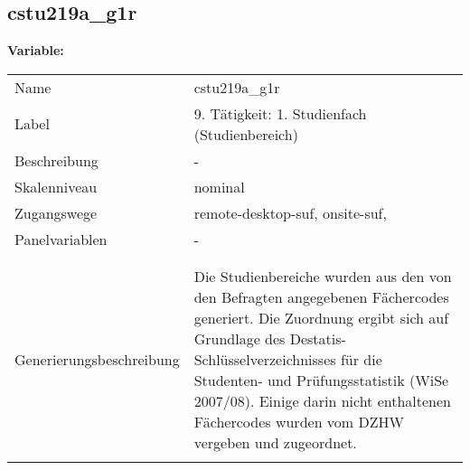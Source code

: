 	
	
	\subsection{cstu219a\_g1r}
	\label{subSection:cstu219a_g1r}

	\noindent\textbf{Variable:}\\
		\begin{tabular}{lL{11.3cm}}
			\label{tableVariable:cstu219a_g1r}
			Name & cstu219a\_g1r \\
			Label & 9. Tätigkeit: 1. Studienfach (Studienbereich) \\
			Beschreibung & - \\
			Skalenniveau & nominal \\
			Zugangswege &
				remote-desktop-suf,
				onsite-suf,
 \\
			Panelvariablen & -
			 \\
			 \\
 \\
					Generierungsbeschreibung & Die Studienbereiche wurden aus den von den Befragten angegebenen Fächercodes generiert. Die Zuordnung ergibt sich auf Grundlage des Destatis-Schlüsselverzeichnisses für die Studenten- und Prüfungsstatistik (WiSe 2007/08). Einige darin nicht enthaltenen Fächercodes wurden vom DZHW vergeben und zugeordnet. 
				 \\	
			 \\
		\end{tabular}







